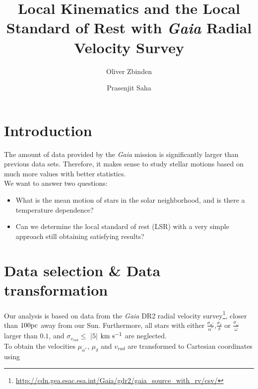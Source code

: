 \documentclass{aastex62}
\begin{document}
	
	\title{Local Kinematics and the Local Standard of Rest with \textit{Gaia} Radial Velocity Survey}
	
	
	\author{Oliver Zbinden}
	
	
	\author{Prasenjit Saha}

	
	\section{Introduction}
	\noindent
	The amount of data provided by the \textit{Gaia} mission \citep{gaiamission} is significantly larger than previous data sets. Therefore, it makes sense to study stellar motions based on much more values with better statistics. 
	\noindent
	\\
	We want to answer two questions:
	\begin{itemize}
		\item What is the mean motion of stars in the solar neighborhood, and is there a temperature dependence?
		\item Can we determine the local standard of rest (LSR) with a very simple approach still obtaining  satisfying results?
	\end{itemize}
	
	\section{Data selection \& Data transformation} 
	\noindent
	Our analysis is based on data from the \textit{Gaia} DR2 radial velocity survey\footnote{\url{http://cdn.gea.esac.esa.int/Gaia/gdr2/gaia_source_with_rv/csv/}}, closer than $100\rm pc$ away from our Sun. Furthermore, all stars with either $\frac{\sigma_{\alpha^*}}{\alpha^*}$,$\frac{\sigma_{\delta}}{\delta}$ or $\frac{\sigma_{\bar{\omega}}}{\bar{\omega}}$ larger than $0.1$, and $\sigma_{v_{rad}}\leq$ $|5|$ $\rm km~s^{-1}$ are neglected.
	\\
	To obtain the velocities $\mu_{\alpha^*}$, $\mu_{\delta}$ and $v_{rad}$ are transformed to Cartesian coordinates using
	
\end{document}
